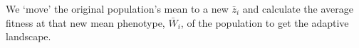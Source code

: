\documentclass{standalone}
\begin{document}
\setmainfont{texgyreadventor}\fontsize{12}{15}\selectfont\begin{minipage}{3in}We `move' the original population's mean to a new $\bar z_i$ and calculate the average fitness at that new mean phenotype, $\bar W_i$, of the population to get the adaptive landscape.\end{minipage}
\end{document}
